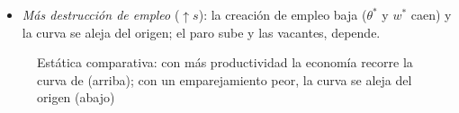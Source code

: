 \documentclass[11pt]{article}
\begin{document}
\begin{itemize}
\begin{itemize}
\begin{itemize}
    \item \emph{Más destrucción de empleo} ($\uparrow s$): la creación de empleo baja ($\theta^*$ y $w^*$ caen) y la curva se aleja del origen; el paro sube y las vacantes, depende.
    \end{itemize}
  \end{itemize}
\end{itemize}

\begin{figure}[H]
\centering
\caption{Estática comparativa: con más productividad la economía recorre la curva de  (arriba); con un emparejamiento peor, la curva se aleja del origen (abajo)}\label{fig:dmp-estatica}
\end{figure}
\end{document}
